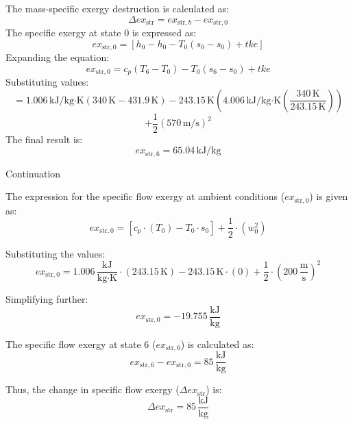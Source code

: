 The mass-specific exergy destruction is calculated as:  
\[
\Delta ex_{\text{str}} = ex_{\text{str},b} - ex_{\text{str},0}
\]
The specific exergy at state \( 0 \) is expressed as:  
\[
ex_{\text{str},0} = [h_0 - h_0 - T_0(s_0 - s_0) + tke]
\]
Expanding the equation:  
\[
ex_{\text{str},0} = c_p \left( T_6 - T_0 \right) - T_0 \left( s_6 - s_0 \right) + tke
\]
Substituting values:  
\[
= 1.006 \, \text{kJ/kg·K} \left( 340 \, \text{K} - 431.9 \, \text{K} \right) - 243.15 \, \text{K} \left( 4.006 \, \text{kJ/kg·K} \left( \frac{340 \, \text{K}}{243.15 \, \text{K}} \right) \right)
\]
\[
+ \frac{1}{2} \left( 570 \, \text{m/s} \right)^2
\]
The final result is:  
\[
ex_{\text{str},6} = 65.04 \, \text{kJ/kg}
\]

Continuation  

The expression for the specific flow exergy at ambient conditions (\( ex_{\text{str},0} \)) is given as:  
\[
ex_{\text{str},0} = \left[ c_p \cdot (T_0) - T_0 \cdot s_0 \right] + \frac{1}{2} \cdot \left( w_0^2 \right)
\]

Substituting the values:  
\[
ex_{\text{str},0} = 1.006 \, \frac{\text{kJ}}{\text{kg·K}} \cdot (243.15 \, \text{K}) - 243.15 \, \text{K} \cdot (0) + \frac{1}{2} \cdot (200 \, \frac{\text{m}}{\text{s}})^2
\]

Simplifying further:  
\[
ex_{\text{str},0} = -19.755 \, \frac{\text{kJ}}{\text{kg}}
\]

The specific flow exergy at state 6 (\( ex_{\text{str},6} \)) is calculated as:  
\[
ex_{\text{str},6} - ex_{\text{str},0} = 85 \, \frac{\text{kJ}}{\text{kg}}
\]

Thus, the change in specific flow exergy (\( \Delta ex_{\text{str}} \)) is:  
\[
\Delta ex_{\text{str}} = 85 \, \frac{\text{kJ}}{\text{kg}}
\]